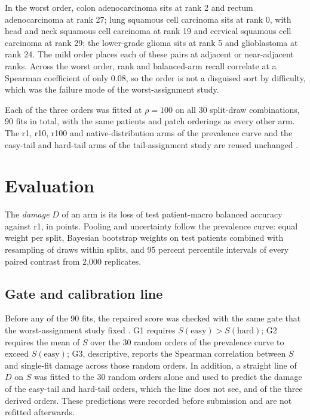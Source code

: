 \documentclass[11pt]{article}
\begin{document}
In the worst order, colon adenocarcinoma sits at rank 2 and rectum adenocarcinoma at rank 27; lung squamous cell carcinoma sits at rank 0, with head and neck squamous cell carcinoma at rank 19 and cervical squamous cell carcinoma at rank 29; the lower-grade glioma sits at rank 5 and glioblastoma at rank 24. The mild order places each of these pairs at adjacent or near-adjacent ranks. Across the worst order, rank and balanced-arm recall correlate at a Spearman coefficient of only 0.08, so the order is not a disguised sort by difficulty, which was the failure mode of the worst-assignment study.

Each of the three orders was fitted at $\rho=100$ on all 30 split-draw combinations, 90 fits in total, with the same patients and patch orderings as every other arm. The r1, r10, r100 and native-distribution arms of the prevalence curve and the easy-tail and hard-tail arms of the tail-assignment study are reused unchanged \citep{queisler2026prevalenceTcga, queisler2026tailTcga}.

\section{Evaluation}
\label{sec:evaluation}
The \emph{damage} $D$ of an arm is its loss of test patient-macro balanced accuracy against r1, in points. Pooling and uncertainty follow the prevalence curve: equal weight per split, Bayesian bootstrap weights on test patients \citep{rubin1981bayesian} combined with resampling of draws within splits, and 95 percent percentile intervals of every paired contrast from 2,000 replicates.

\subsection{Gate and calibration line}
\label{sec:gate}
Before any of the 90 fits, the repaired score was checked with the same gate that the worst-assignment study fixed \citep{queisler2026worstTcga}. G1 requires $S(\text{easy}) > S(\text{hard})$; G2 requires the mean of $S$ over the 30 random orders of the prevalence curve to exceed $S(\text{easy})$; G3, descriptive, reports the Spearman correlation between $S$ and single-fit damage across those random orders. In addition, a straight line of $D$ on $S$ was fitted to the 30 random orders alone and used to predict the damage of the easy-tail and hard-tail orders, which the line does not see, and of the three derived orders. These predictions were recorded before submission and are not refitted afterwards.
\end{document}
